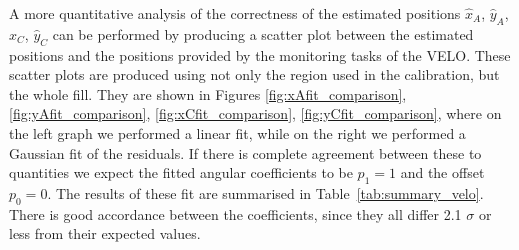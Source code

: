 A more quantitative analysis of the correctness of the estimated positions $\hat{x}_A$, $\hat{y}_{A}$, $\hat{x}_C$, $\hat{y}_C$ can be performed by producing a scatter plot between the estimated positions and the positions provided by the monitoring tasks of the VELO. These scatter plots are produced using not only the region used in the calibration, but the whole fill. They are shown in Figures \ref{fig:xAfit_comparison}, \ref{fig:yAfit_comparison}, \ref{fig:xCfit_comparison}, \ref{fig:yCfit_comparison}, where on the left graph we performed a linear fit, while on the right we performed a Gaussian fit of the residuals. If there is complete agreement between these to quantities we expect the fitted angular coefficients to be $p_1=1$ and the offset $p_0=0$. 
The results of these fit are summarised in Table~\ref{tab:summary_velo}. There is good accordance between the coefficients, since they all differ 2.1 $\sigma$ or less from their expected values. 


